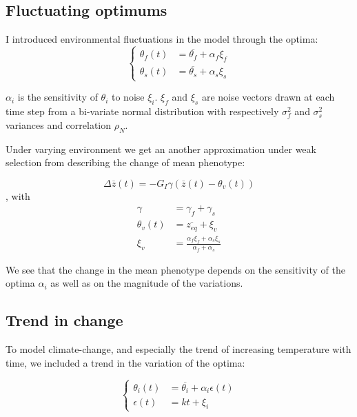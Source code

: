 \subsection*{Fluctuating optimums}

I introduced environmental fluctuations in the model through the optima:
\begin{equation}
\left\{
	\begin{aligned}
		\theta_f(t) &= \overline{\theta_f} + \alpha_f \xi_f \\
		\theta_s(t) &= \overline{\theta_s} + \alpha_s \xi_s
	\end{aligned}
\right.
\end{equation}

$\alpha_i$ is the sensitivity of $\theta_i$ to noise $\xi_i$. $\xi_f$ and $\xi_s$ are noise vectors drawn at each time step from a bi-variate normal distribution with respectively $\sigma_f^2$ and $\sigma_s^2$ variances and correlation $\rho_N$.

Under varying environment we get an another approximation under weak selection from \citep{engen_evolution_2011} describing the change of mean phenotype:

\begin{equation}
	\label{eq:zfluct}
	\Delta \overline{z}(t) = - G_I \gamma (\overline{z}(t) - \theta_v(t))
\end{equation}
, with
\begin{subequations}
	\begin{align}
		\gamma &= \gamma_f + \gamma_s \\
		\theta_v(t) &= \overline{z_{eq}} + \xi_v \\
		\xi_v &= \frac{\alpha_f \xi_f + \alpha_s \xi_s}{\alpha_f + \alpha_s}
	\end{align}
\end{subequations}

We see that the change in the mean phenotype depends on the sensitivity of the optima $\alpha_i$ as well as on the magnitude of the variations.

\subsection*{Trend in change}

To model climate-change, and especially the trend of increasing temperature with time, we included a trend in the variation of the optima:

\begin{equation}
	\label{eq:kt}
	\left\{
	\begin{aligned}
		\theta_i(t) &= \overline{\theta_i} + \alpha_i\epsilon(t) \\
		\epsilon(t) &= kt + \xi_i
	\end{aligned}
	\right.
\end{equation}

